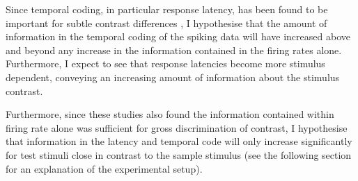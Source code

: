 Since temporal coding, in particular response latency, has been found to be important for subtle contrast differences \cite{Reich2001,Arabzadeh2006}, I hypothesise that the amount of information in the temporal coding of the spiking data will have increased above and beyond any increase in the information contained in the firing rates alone. Furthermore, I expect to see that response latencies become more stimulus dependent, conveying an increasing amount of information about the stimulus contrast.

Furthermore, since these studies \cite{Reich2001,Arabzadeh2006} also found the information contained within firing rate alone was sufficient for gross discrimination of contrast, I hypothesise that information in the latency and temporal code will only increase significantly for test stimuli close in contrast to the sample stimulus (see the following section for an explanation of the experimental setup).

